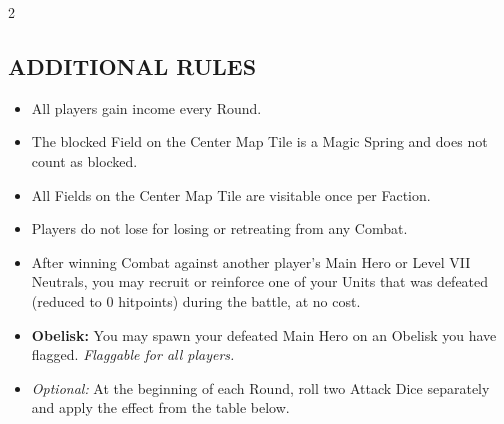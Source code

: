 \begin{multicols*}{2}
\subsection*{\MakeUppercase{Additional Rules}}
\begin{itemize}
  \item All players gain income every Round.
  \item The blocked Field on the Center Map Tile is a Magic Spring and does not count as blocked.
  \item All Fields on the Center Map Tile are visitable once per Faction.
  \item Players do not lose  for losing or retreating from any Combat.
  \item After winning Combat against another player’s Main Hero or Level VII Neutrals, you may recruit or reinforce one of your Units that was defeated (reduced to 0 hitpoints) during the battle, at no cost.
  \item \textbf{Obelisk:} You may spawn your defeated Main Hero on an Obelisk you have flagged. \textit{Flaggable for all players.}
  \item \textit{Optional:} At the beginning of each Round, roll two Attack Dice separately and apply the effect from the table below.
\end{itemize}

\vspace*{\fill}


\end{multicols*}

